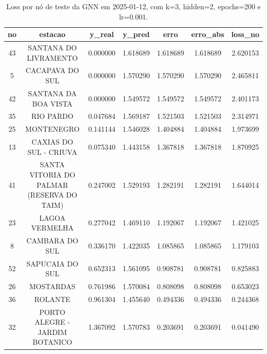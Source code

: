 \begin{table}[h]
\centering
\caption{Loss por nó de teste da GNN em 2025-01-12, com k=3, hidden=2, epochs=200 e lr=0.001.}
\label{tab:gnn_loss_nodes_k3_hidden2}
\begin{tabular}{ccccccc}
\toprule
no & estacao & y\_real & y\_pred & erro & erro\_abs & loss\_no \\
\midrule
43 & SANTANA DO LIVRAMENTO & 0.000000 & 1.618689 & 1.618689 & 1.618689 & 2.620153 \\
5 & CACAPAVA DO SUL & 0.000000 & 1.570290 & 1.570290 & 1.570290 & 2.465811 \\
42 & SANTANA DA BOA VISTA & 0.000000 & 1.549572 & 1.549572 & 1.549572 & 2.401173 \\
35 & RIO PARDO & 0.047684 & 1.569187 & 1.521503 & 1.521503 & 2.314971 \\
25 & MONTENEGRO & 0.141144 & 1.546028 & 1.404884 & 1.404884 & 1.973699 \\
13 & CAXIAS DO SUL - CRIUVA & 0.075340 & 1.443158 & 1.367818 & 1.367818 & 1.870925 \\
41 & SANTA VITORIA DO PALMAR (RESERVA DO TAIM) & 0.247002 & 1.529193 & 1.282191 & 1.282191 & 1.644014 \\
23 & LAGOA VERMELHA & 0.277042 & 1.469110 & 1.192067 & 1.192067 & 1.421025 \\
8 & CAMBARA DO SUL & 0.336170 & 1.422035 & 1.085865 & 1.085865 & 1.179103 \\
52 & SAPUCAIA DO SUL & 0.652313 & 1.561095 & 0.908781 & 0.908781 & 0.825883 \\
26 & MOSTARDAS & 0.761986 & 1.570084 & 0.808098 & 0.808098 & 0.653023 \\
36 & ROLANTE & 0.961304 & 1.455640 & 0.494336 & 0.494336 & 0.244368 \\
32 & PORTO ALEGRE - JARDIM BOTANICO & 1.367092 & 1.570783 & 0.203691 & 0.203691 & 0.041490 \\
\bottomrule
\end{tabular}
\end{table}
